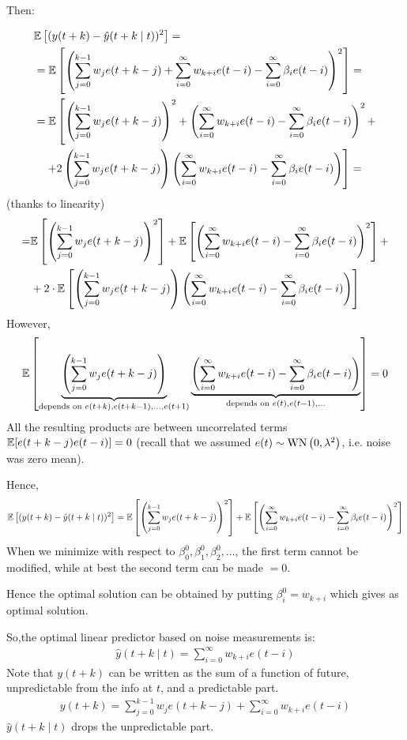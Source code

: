 Then:

\begin{align*}
	&\mathbb{E}\left[(y(t+k)-\hat{y}(t+k \mid t))^{2}\right]= \\
	&=\mathbb{E}\left[\left(\sum_{j=0}^{k-1} w_{j} e(t+k-j)+\sum_{i=0}^{\infty} w_{k+i} e(t-i)-\sum_{i=0}^{\infty} \beta_{i} e(t-i)\right)^{2}\right]= \\
	&=\mathbb{E}\left[\left(\sum_{j=0}^{k-1} w_{j} e(t+k-j)\right)^{2}+\left(\sum_{i=0}^{\infty} w_{k+i} e(t-i)-\sum_{i=0}^{\infty} \beta_{i} e(t-i)\right)^{2}+\right. \\
	&\left.\quad+2\left(\sum_{j=0}^{k-1} w_{j} e(t+k-j)\right)\left(\sum_{i=0}^{\infty} w_{k+i} e(t-i)-\sum_{i=0}^{\infty} \beta_{i} e(t-i)\right)\right]=
\end{align*}
(thanks to linearity)
\begin{align*}
	=& \mathbb{E}\left[\left(\sum_{j=0}^{k-1} w_{j} e(t+k-j)\right)^{2}\right]+\mathbb{E}\left[\left(\sum_{i=0}^{\infty} w_{k+i} e(t-i)-\sum_{i=0}^{\infty} \beta_{i} e(t-i)\right)^{2}\right]+\\
	&+2 \cdot \mathbb{E}\left[\left(\sum_{j=0}^{k-1} w_{j} e(t+k-j)\right)\left(\sum_{i=0}^{\infty} w_{k+i} e(t-i)-\sum_{i=0}^{\infty} \beta_{i} e(t-i)\right)\right]
\end{align*}
However,
\begin{align*}
	\mathbb{E}\left[\underbrace{\left(\sum_{j=0}^{k-1} w_{j} e(t+k-j)\right)}_{\text{depends on }e(t+k),e(t+k-1),\ldots,e(t+1)}\underbrace{\left( \sum_{i=0}^{\infty} w_{k+i} e(t-i)-\sum_{i=0}^{\infty} \beta_{i} e(t-i)\right)}_{\text{depends on }e(t),e(t-1),\ldots}\right]=0
\end{align*}
All the resulting products are between uncorrelated terms
$\mathbb{E}[e(t+k-j) e(t-i)]=0$ (recall that we assumed $e(t) \sim \operatorname{WN}\left(0, \lambda^{2}\right)$, i.e.
noise was zero mean).

Hence,
\begin{align*}
	\mathbb{E}\left[(y(t+k)-\hat{y}(t+k \mid t))^{2}\right]=\mathbb{E}\left[\left(\sum_{j=0}^{k-1} w_{j} e(t+k-j)\right)^{2}\right]+\mathbb{E}\left[\left(\sum_{i=0}^{\infty} w_{k+i} e(t-i)-\sum_{i=0}^{\infty} \beta_{i} e(t-i)\right)^{2}\right]
\end{align*}
When we minimize with respect to $\beta_{0}^{0}, \beta_{1}^{0}, \beta_{2}^{0}, \ldots$, the first term cannot 
be modified, while at best the second term can be made $= 0$. 

Hence the optimal solution can be obtained by putting 
$\beta_{i}^{0}= w_{k+i}$ which gives as optimal solution.

So,the optimal linear predictor based on noise measurements is:
\begin{align*}
	\hat{y}(t+k \mid t) = \sum_{i=0}^{\infty}w_{k+i} e(t-i)
\end{align*}
Note that $y(t+k)$ can be written as the sum of a function of future, unpredictable from the info at $t$, and a predictable part. 
\begin{align*}
	y(t+k)=\sum_{j=0}^{k-1} w_{j} e(t+k-j)+\sum_{i=0}^{\infty} w_{k+i} e(t-i)
\end{align*}
$\hat{y}(t+k \mid t) $ drops the unpredictable part.

